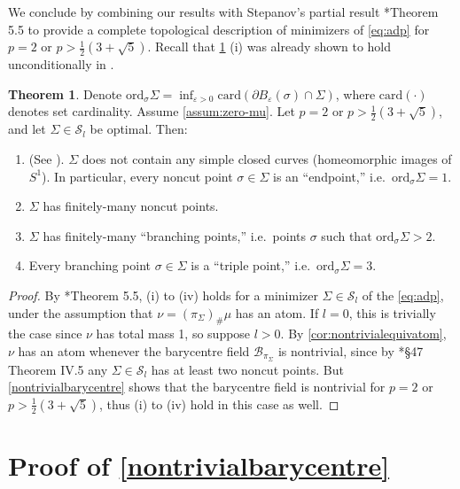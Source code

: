 \documentclass[preprint, reqno]{amsart}
\renewcommand{\epsilon}{\varepsilon}
\newcommand{\lbonpval}{\frac{1}{2}(3+\sqrt{5})}
\newcommand{\card}{\mathrm{card}}
\theoremstyle{definition}
\newtheorem{theorem}[definition]{Theorem}
\numberwithin{equation}{section}
\begin{document}
We conclude by combining our results with Stepanov's partial result
\cite{Stepanov06}*{Theorem 5.5} to provide a complete topological
description of minimizers of \eqref{eq:adp} for $p = 2$ or $p >
\frac{1}{2}(3 + \sqrt{5})$. Recall that
\cref{topologicalcharacterization} (i) was already shown to hold
unconditionally in \cite{Stepanov04}.
\begin{theorem}\label{topologicalcharacterization} Denote
  $\mathrm{ord}_{\sigma}\Sigma = \inf_{\epsilon > 0}\card(\partial
  B_{\epsilon}(\sigma) \cap \Sigma )$, where $\mathrm{card}( \cdot )$
  denotes set cardinality. Assume \eqref{assum:zero-mu}. Let $p = 2$
  or $p > \lbonpval$, and let $\Sigma \in \mathcal{S}_l$ be optimal.
  Then:
  \begin{enumerate}[label=(\roman*)]
    \item (See \cite[Theorem 5.6]{Stepanov04}). $\Sigma$ does not
      contain any simple closed curves (homeomorphic images of $S^1$).
      In particular, every noncut point $\sigma \in \Sigma$ is an
      ``endpoint,'' i.e.\ $\mathrm{ord}_\sigma \Sigma = 1$.
    \item $\Sigma$ has finitely-many noncut points.
    \item $\Sigma$ has finitely-many ``branching points,'' i.e.\
      points $\sigma$ such that $\mathrm{ord}_{\sigma}\Sigma > 2$.
    \item Every branching point $\sigma \in \Sigma$ is a ``triple
      point,'' i.e.\ $\mathrm{ord}_{\sigma}\Sigma = 3$.
  \end{enumerate}
\end{theorem}
\begin{proof}
  By \cite{Stepanov06}*{Theorem 5.5}, (i) to (iv) holds for a
  minimizer $\Sigma \in \mathcal{S}_l$ of the \eqref{eq:adp}, under
  the assumption that $\nu = (\pi_{\Sigma})_{\#}\mu$ has an atom. If
  $l = 0$, this is trivially the case since $\nu$ has total mass 1, so
  suppose $l > 0$. By \cref{cor:nontrivialequivatom}, $\nu$ has an
  atom whenever the barycentre field $\mathcal{B}_{\pi_{\Sigma}}$ is
  nontrivial, since by \cite{kuratowski}*{§47 Theorem IV.5} any
  $\Sigma \in \mathcal{S}_l$ has at least two noncut points. But
  \cref{nontrivialbarycentre} shows that the barycentre field is
  nontrivial for $p = 2$ or $p > \lbonpval$, thus (i) to (iv) hold in
  this case as well.
\end{proof}

\section{Proof of \cref{nontrivialbarycentre}}
\label{sec:proof-main}
\end{document}
